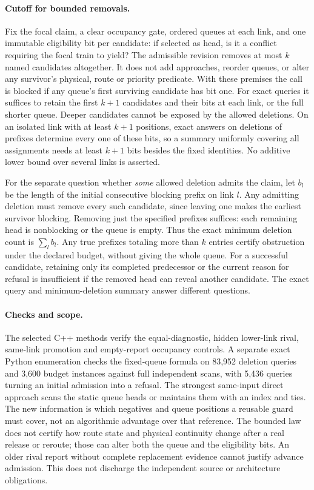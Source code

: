 \documentclass[11pt]{article}
\begin{document}
\paragraph{Cutoff for bounded removals.}
Fix the focal claim, a clear occupancy gate, ordered queues at each link, and one immutable eligibility bit per candidate: if selected as head, is it a conflict requiring the focal train to yield? The admissible revision removes at most $k$ named candidates altogether. It does not add approaches, reorder queues, or alter any survivor's physical, route or priority predicate. With these premises the call is blocked if any queue's first surviving candidate has bit one. For exact queries it suffices to retain the first $k+1$ candidates and their bits at each link, or the full shorter queue. Deeper candidates cannot be exposed by the allowed deletions. On an isolated link with at least $k+1$ positions, exact answers on deletions of prefixes determine every one of these bits, so a summary uniformly covering all assignments needs at least $k+1$ bits besides the fixed identities. No additive lower bound over several links is asserted.

For the separate question whether \emph{some} allowed deletion admits the claim, let $b_l$ be the length of the initial consecutive blocking prefix on link $l$. Any admitting deletion must remove every such candidate, since leaving one makes the earliest survivor blocking. Removing just the specified prefixes suffices: each remaining head is nonblocking or the queue is empty. Thus the exact minimum deletion count is $\sum_l b_l$. Any true prefixes totaling more than $k$ entries certify obstruction under the declared budget, without giving the whole queue. For a successful candidate, retaining only its completed predecessor or the current reason for refusal is insufficient if the removed head can reveal another candidate. The exact query and minimum-deletion summary answer different questions.

\paragraph{Checks and scope.}
The selected C++ methods verify the equal-diagnostic, hidden lower-link rival, same-link promotion and empty-report occupancy controls. A separate exact Python enumeration checks the fixed-queue formula on 83,952 deletion queries and 3,600 budget instances against full independent scans, with 5,436 queries turning an initial admission into a refusal. The strongest same-input direct approach scans the static queue heads or maintains them with an index and ties. The new information is which negatives and queue positions a reusable guard must cover, not an algorithmic advantage over that reference. The bounded law does not certify how route state and physical continuity change after a real release or reroute; those can alter both the queue and the eligibility bits. An older rival report without complete replacement evidence cannot justify advance admission. This does not discharge the independent source or architecture obligations.
\end{document}
